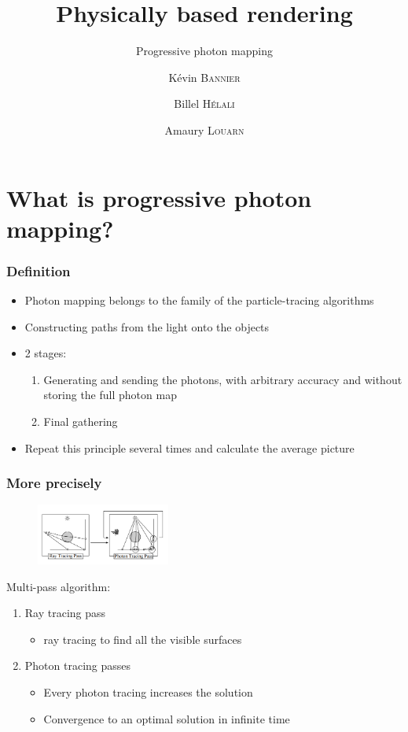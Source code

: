 \documentclass{beamer}
\title{Physically based rendering}
\subtitle{Progressive photon mapping}
\author[Bannier, Helali, Louarn]{Kévin \textsc{Bannier} \and Billel \textsc{Hélali} \and Amaury \textsc{Louarn}}
\institute{\'Ecole Supérieure d'ingénieurs de Rennes\\Université de Rennes 1}
\begin{document}
\frame{\titlepage}

\section{What is progressive photon mapping?}
\begin{frame}
    \frametitle{Definition}
    \begin{itemize}
        \item Photon mapping belongs to the family of the particle-tracing algorithms
        \item Constructing paths from the light onto the objects
            \vfill
        \item 2 stages:
            \begin{enumerate}
                \item Generating and sending the photons, with arbitrary accuracy and without storing the full photon map
                \item Final gathering
            \end{enumerate}
        \item Repeat this principle several times and calculate the average picture
    \end{itemize}
\end{frame}
\begin{frame}
    \frametitle{More precisely}
    \begin{figure}
        \centering
        \includegraphics[height=2cm]{img/PPM}
    \end{figure}
    Multi-pass algorithm:
    \begin{enumerate}
        \item Ray tracing pass
            \begin{itemize}
                \item ray tracing to find all the visible surfaces
            \end{itemize}
        \item Photon tracing passes
            \begin{itemize}
                \item Every photon tracing increases the solution
                \item Convergence to an optimal solution in infinite time
            \end{itemize}
    \end{enumerate}
\end{frame}
\end{document}
